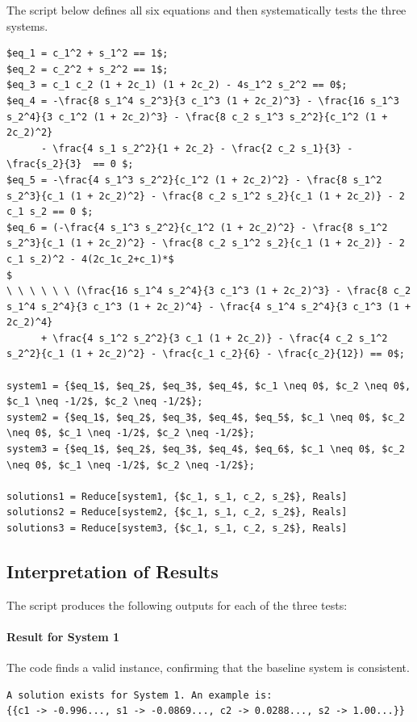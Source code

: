 \documentclass[12pt]{amsart}
\begin{document}
The script below defines all six equations and then systematically tests the three systems.

\begin{lstlisting}[style=mystyle, breaklines=true, caption={System of Equations in Mathematica}]
$eq_1 = c_1^2 + s_1^2 == 1$;
$eq_2 = c_2^2 + s_2^2 == 1$;
$eq_3 = c_1 c_2 (1 + 2c_1) (1 + 2c_2) - 4s_1^2 s_2^2 == 0$;
$eq_4 = -\frac{8 s_1^4 s_2^3}{3 c_1^3 (1 + 2c_2)^3} - \frac{16 s_1^3 s_2^4}{3 c_1^2 (1 + 2c_2)^3} - \frac{8 c_2 s_1^3 s_2^2}{c_1^2 (1 + 2c_2)^2} 
      - \frac{4 s_1 s_2^2}{1 + 2c_2} - \frac{2 c_2 s_1}{3} - \frac{s_2}{3}  == 0 $;
$eq_5 = -\frac{4 s_1^3 s_2^2}{c_1^2 (1 + 2c_2)^2} - \frac{8 s_1^2 s_2^3}{c_1 (1 + 2c_2)^2} - \frac{8 c_2 s_1^2 s_2}{c_1 (1 + 2c_2)} - 2 c_1 s_2 == 0 $;
$eq_6 = (-\frac{4 s_1^3 s_2^2}{c_1^2 (1 + 2c_2)^2} - \frac{8 s_1^2 s_2^3}{c_1 (1 + 2c_2)^2} - \frac{8 c_2 s_1^2 s_2}{c_1 (1 + 2c_2)} - 2 c_1 s_2)^2 - 4(2c_1c_2+c_1)*$
$ 
\ \ \ \ \ \ (\frac{16 s_1^4 s_2^4}{3 c_1^3 (1 + 2c_2)^3} - \frac{8 c_2 s_1^4 s_2^4}{3 c_1^3 (1 + 2c_2)^4} - \frac{4 s_1^4 s_2^4}{3 c_1^3 (1 + 2c_2)^4}
      + \frac{4 s_1^2 s_2^2}{3 c_1 (1 + 2c_2)} - \frac{4 c_2 s_1^2 s_2^2}{c_1 (1 + 2c_2)^2} - \frac{c_1 c_2}{6} - \frac{c_2}{12}) == 0$;

system1 = {$eq_1$, $eq_2$, $eq_3$, $eq_4$, $c_1 \neq 0$, $c_2 \neq 0$, $c_1 \neq -1/2$, $c_2 \neq -1/2$};
system2 = {$eq_1$, $eq_2$, $eq_3$, $eq_4$, $eq_5$, $c_1 \neq 0$, $c_2 \neq 0$, $c_1 \neq -1/2$, $c_2 \neq -1/2$};
system3 = {$eq_1$, $eq_2$, $eq_3$, $eq_4$, $eq_6$, $c_1 \neq 0$, $c_2 \neq 0$, $c_1 \neq -1/2$, $c_2 \neq -1/2$};

solutions1 = Reduce[system1, {$c_1, s_1, c_2, s_2$}, Reals]
solutions2 = Reduce[system2, {$c_1, s_1, c_2, s_2$}, Reals]
solutions3 = Reduce[system3, {$c_1, s_1, c_2, s_2$}, Reals]
\end{lstlisting}

\subsection*{Interpretation of Results}

The script produces the following outputs for each of the three tests:

\paragraph{Result for System 1}
The code finds a valid instance, confirming that the baseline system is consistent.
\begin{verbatim}
A solution exists for System 1. An example is: 
{{c1 -> -0.996..., s1 -> -0.0869..., c2 -> 0.0288..., s2 -> 1.00...}}
\end{verbatim}
\end{document}
